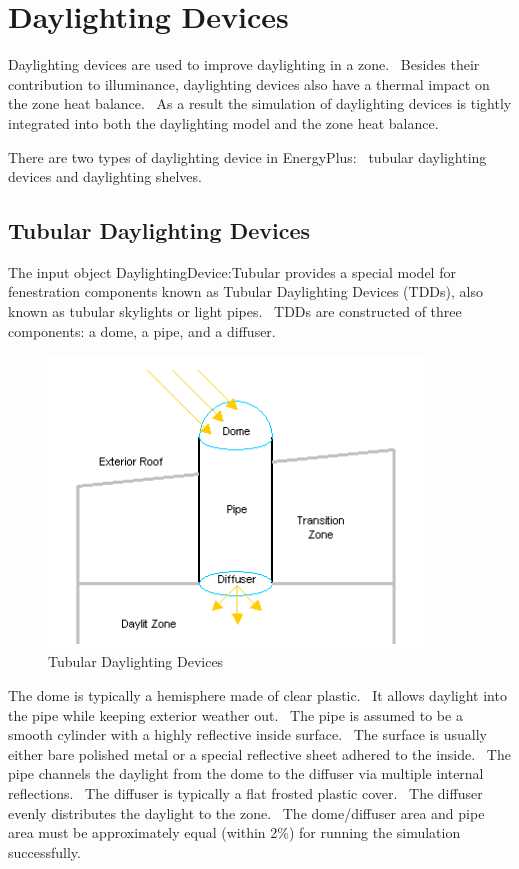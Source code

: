 \section{Daylighting Devices}\label{daylighting-devices}

Daylighting devices are used to improve daylighting in a zone.~ Besides their contribution to illuminance, daylighting devices also have a thermal impact on the zone heat balance.~ As a result the simulation of daylighting devices is tightly integrated into both the daylighting model and the zone heat balance.

There are two types of daylighting device in EnergyPlus:~ tubular daylighting devices and daylighting shelves.

\subsection{Tubular Daylighting Devices}\label{tubular-daylighting-devices}

The input object DaylightingDevice:Tubular provides a special model for fenestration components known as Tubular Daylighting Devices (TDDs), also known as tubular skylights or light pipes.~ TDDs are constructed of three components: a dome, a pipe, and a diffuser.

\begin{figure}[hbtp] %
\centering
\includegraphics[width=0.9\textwidth, height=0.9\textheight, keepaspectratio=true]{media/image869.png}
\caption{Tubular Daylighting Devices \protect \label{fig:tubular-daylighting-devices}}
\end{figure}

The dome is typically a hemisphere made of clear plastic.~ It allows daylight into the pipe while keeping exterior weather out.~ The pipe is assumed to be a smooth cylinder with a highly reflective inside surface.~ The surface is usually either bare polished metal or a special reflective sheet adhered to the inside.~ The pipe channels the daylight from the dome to the diffuser via multiple internal reflections.~ The diffuser is typically a flat frosted plastic cover.~ The diffuser evenly distributes the daylight to the zone.~ The dome/diffuser area and pipe area must be approximately equal (within 2\%) for running the simulation successfully.

